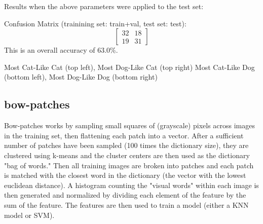 \documentclass[fleqn]{article}
\begin{document}
Results when the above parameters were applied to the test set:

Confusion Matrix (trainining set: train+val, test set: test):
\[
  \begin{bmatrix}
    32 & 18 \\
    19 & 31
  \end{bmatrix}
\]
This is an overall accuracy of 63.0\%.
\begin{center}
    Most Cat-Like Cat (top left), Most Dog-Like Cat (top right)\break
    Most Cat-Like Dog (bottom left), Most Dog-Like Dog (bottom right)
\end{center}



\subsection{bow-patches}
Bow-patches works by sampling small squares of (grayscale) pixels across images in the training set, then flattening each patch into a vector.  After a sufficient number of patches have been sampled (100 times the dictionary size), they are clustered using k-means and the cluster centers are then used as the dictionary "bag of words."  Then all training images are broken into patches and each patch is matched with the closest word in the dictionary (the vector with the lowest euclidean distance).  A histogram counting the "visual words" within each image is then generated and normalized by dividing each element of the feature by the sum of the feature.  The features are then used to train a model (either a KNN model or SVM).
\end{document}
